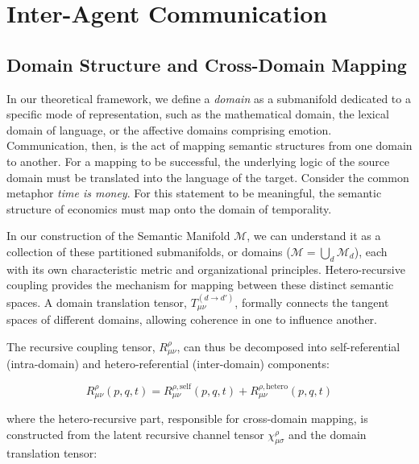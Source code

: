 \chapter{Inter-Agent Communication}
\label{14:inter_agent_communication}


\section{Domain Structure and Cross-Domain Mapping}
\label{14.1:domain_structure_and_cross_domain_mapping}

In our theoretical framework, we define a \textit{domain} as a submanifold dedicated to a specific mode of representation, such as the mathematical domain, the lexical domain of language, or the affective domains comprising emotion. Communication, then, is the act of mapping semantic structures from one domain to another. For a mapping to be successful, the underlying logic of the source domain must be translated into the language of the target. Consider the common metaphor \textit{time is money}. For this statement to be meaningful, the semantic structure of economics must map onto the domain of temporality.

In our construction of the Semantic Manifold \(\mathcal{M}\), we can understand it as a collection of these partitioned submanifolds, or domains (\(\mathcal{M} = \bigcup_d \mathcal{M}_d\)), each with its own characteristic metric and organizational principles. Hetero-recursive coupling provides the mechanism for mapping between these distinct semantic spaces. A domain translation tensor, \(T_{\mu\nu}^{(d \to d')}\), formally connects the tangent spaces of different domains, allowing coherence in one to influence another.

The recursive coupling tensor, \(R^\rho_{\mu\nu}\), can thus be decomposed into self-referential (intra-domain) and hetero-referential (inter-domain) components:

\begin{equation}
R^\rho_{\mu\nu}(p, q, t) = R^{\rho, \text{self}}_{\mu\nu}(p, q, t) + R^{\rho, \text{hetero}}_{\mu\nu}(p, q, t)
\end{equation}

where the hetero-recursive part, responsible for cross-domain mapping, is constructed from the latent recursive channel tensor \(\chi^\rho_{\mu\sigma}\) and the domain translation tensor:

